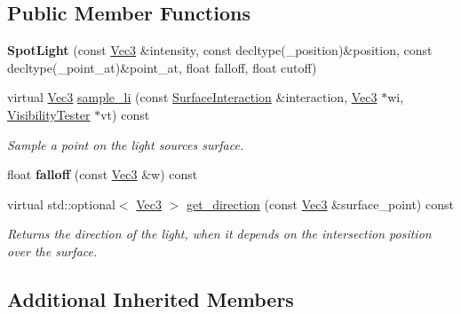 \subsection*{Public Member Functions}
\begin{DoxyCompactItemize}
\item 
\mbox{\label{classomg_1_1_spot_light_a0246eb4b157b71541921b23104995153}} 
{\bfseries Spot\+Light} (const \mbox{\hyperlink{namespaceomg_a45a9482677fee9933ff369b49894e316}{Vec3}} \&intensity, const decltype(\+\_\+position)\&position, const decltype(\+\_\+point\+\_\+at)\&point\+\_\+at, float falloff, float cutoff)
\item 
\mbox{\label{classomg_1_1_spot_light_abac464ecd5e2799577c3d01983b87ff6}} 
virtual \mbox{\hyperlink{namespaceomg_a45a9482677fee9933ff369b49894e316}{Vec3}} \mbox{\hyperlink{classomg_1_1_spot_light_abac464ecd5e2799577c3d01983b87ff6}{sample\+\_\+li}} (const \mbox{\hyperlink{classomg_1_1_surface_interaction}{Surface\+Interaction}} \&interaction, \mbox{\hyperlink{namespaceomg_a45a9482677fee9933ff369b49894e316}{Vec3}} $\ast$wi, \mbox{\hyperlink{classomg_1_1_visibility_tester}{Visibility\+Tester}} $\ast$vt) const
\begin{DoxyCompactList}\small\item\em Sample a point on the light source\textquotesingle{}s surface. \end{DoxyCompactList}\item 
\mbox{\label{classomg_1_1_spot_light_acd3d36324dc97bbc407c4f0a0f2dcb6f}} 
float {\bfseries falloff} (const \mbox{\hyperlink{namespaceomg_a45a9482677fee9933ff369b49894e316}{Vec3}} \&w) const
\item 
virtual std\+::optional$<$ \mbox{\hyperlink{namespaceomg_a45a9482677fee9933ff369b49894e316}{Vec3}} $>$ \mbox{\hyperlink{classomg_1_1_spot_light_a8a82a670fff00ac2d72cd2cd4baec335}{get\+\_\+direction}} (const \mbox{\hyperlink{namespaceomg_a45a9482677fee9933ff369b49894e316}{Vec3}} \&surface\+\_\+point) const
\begin{DoxyCompactList}\small\item\em Returns the direction of the light, when it depends on the intersection position over the surface. \end{DoxyCompactList}\end{DoxyCompactItemize}
\subsection*{Additional Inherited Members}


